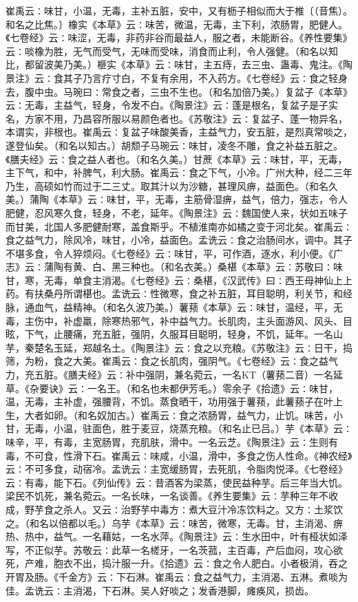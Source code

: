 \documentclass[a4paper,12pt,UTF8,twoside]{ctexbook}
\begin{document}
崔禹云∶味甘，小温，无毒，主补五脏，安中，又有枥子相似而大于椎〔（音焦）。和名之比焦。〕橡实《本草》云∶味苦，微温，无毒，主下利，浓肠胃，肥健人。《七卷经》云∶味涩，无毒，非药非谷而最益人，服之者，未能断谷。《养性要集》云∶啖橡为胜，无气而受气，无味而受味，消食而止利，令人强健。（和名以知比，都留波美乃美。）榧实《本草》云∶味甘，主五痔，去三虫、蛊毒、鬼注。《陶景注》云∶食其子乃言疗寸白，不复有余用，不入药方。《七卷经》云∶食之轻身去，腹中虫。马琬曰∶常食之者，三虫不生也。（和名加倍乃美。）复盆子《本草》云∶无毒，主益气，轻身，令发不白。《陶景注》云∶蓬是根名，复盆子是子实名，方家不用，乃昌容所服以易颜色者也。《苏敬注》云∶复盆子、蓬一物异名，本谓实，非根也。崔禹云∶复盆子味酸美香，主益气力，安五脏，是烈真常啖之，遂登仙矣。（和名以知古。）胡颓子马琬云∶味甘，凌冬不雕，食之补益五脏之。《膳夫经》云∶食之益人者也。（和名久美。）甘蔗《本草》云∶味甘，平，无毒，主下气，和中，补脾气，利大肠。崔禹云∶食之下气，小冷。广州大种，经二三年乃生，高硕如竹而过于二三丈。取其汁以为沙糖，甚理风痹，益面色。（和名久美。）蒲陶《本草》云∶味甘，平，无毒，主筋骨湿痹，益气，倍力，强志，令人肥健，忍风寒久食，轻身，不老，延年。《陶景注》云∶魏国使人来，状如五味子而甘美，北国人多肥健耐寒，盖食斯乎。不植淮南亦如橘之变于河北矣。崔禹云∶食之益气力，除风冷，味甘，小冷，益面色。孟诜云∶食之治肠间水，调中。其子不堪多食，令人猝烦闷。《七卷经》云∶味甘，平，可作酒，逐水，利小便。《广志》云∶蒲陶有黄、白、黑三种也。（和名衣美。）桑椹《本草》云∶苏敬曰∶味甘，寒，无毒，单食主消渴。《七卷经》云∶桑椹，《汉武传》曰∶西王母神仙上上药。有扶桑丹所谓椹也。孟诜云∶性微寒，食之补五脏，耳目聪明，利关节，和经脉，通血气，益精神。（和名久波乃美。）薯蓣《本草》云∶味甘，温经，平，无毒，主伤中，补虚羸，除寒热邪气，补中益气力。长肌肉，主头面游风、风头、目眩，下气，止腰痛，充五脏，强阴，久服耳目聪明，轻身，不饥，延年。一名山芋，秦楚名玉延，郑越名土。《陶景注》云∶食之以充粮。《苏敬注》云∶日干，捣筛，为粉，食之大美。崔禹云∶食之长肌肉，强阴气。《七卷经》云∶食之益气力，充五脏。《膳夫经》云∶补中强阴，兼名菀云，一名KT（薯蓣二音）一名延草。《杂要诀》云∶一名王。（和名也未都伊芳毛。）零余子《拾遗》云∶味甘，温，无毒，主补虚，强腰背，不饥。蒸食晒干，功用强于薯蓣，此薯蓣子在叶上生，大者如卵。（和名奴加古。）崔禹云∶食之浓肠胃，益气力，止饥。味苦，小甘，无毒，小温，驻面色，胜于麦豆，烧蒸充粮。（和名止已吕。）芋《本草》云∶味辛，平，有毒，主宽肠胃，充肌肤，滑中。一名云芝。《陶景注》云∶生则有毒，不可食，性滑下石。崔禹云∶味咸，小温，滑中，多食之伤人性命。《神农经》云∶不可多食，动宿冷。孟诜云∶主宽缓肠胃，去死肌，令脂肉悦泽。《七卷经》云∶有毒，能下石。《列仙传》云∶昔酒客为梁蒸，使民益种芋。后三年当大饥。梁民不饥死，兼名菀云。一名长味，一名谈善。《养生要集》云∶芋种三年不收成，野芋食之杀人。又云∶治野芋中毒方∶煮大豆汁冷冻饮料之。又方∶土浆饮之。（和名以倍都以毛。）乌芋《本草》云∶味苦，微寒，无毒。甘，主消渴、痹热、热中，益气。一名藉姑，一名水萍。《陶景注》云∶生水田中，叶有桠状如泽写，不正似芋。苏敬云∶此草一名槎牙，一名茨菰，主百毒，产后血闷，攻心欲死，产难，胞衣不出，捣汁服一升。《拾遗》云∶食之令人肥白。小者极消，吞之开胃及肠。《千金方》云∶下石淋。崔禹云∶食之益气力，主消渴、五淋。煮啖为佳。孟诜云∶主消渴，下石淋。吴人好啖之；发香港脚，瘫痪风，损齿。
\end{document}
